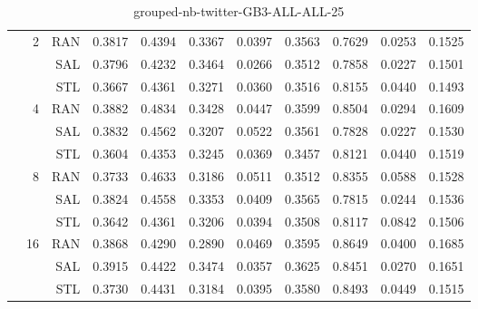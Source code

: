 \begin{center}
\begin{table}[htbp]
\begin{center}
\begin{tabular}{ | r | r | r | r | r | r | r | r | r | r | r |}
 & \multirow{3}{*}{2} & RAN & 0.3817 & 0.4394 & 0.3367 & 0.0397 & 0.3563 & 0.7629 & 0.0253 & 0.1525\\ \cline{3-11}
 &   & SAL & 0.3796 & 0.4232 & 0.3464 & 0.0266 & 0.3512 & 0.7858 & 0.0227 & 0.1501\\ \cline{3-11}
 &   & STL & 0.3667 & 0.4361 & 0.3271 & 0.0360 & 0.3516 & 0.8155 & 0.0440 & 0.1493\\ \cline{2-11}
 & \multirow{3}{*}{4} & RAN & 0.3882 & 0.4834 & 0.3428 & 0.0447 & 0.3599 & 0.8504 & 0.0294 & 0.1609\\ \cline{3-11}
 &   & SAL & 0.3832 & 0.4562 & 0.3207 & 0.0522 & 0.3561 & 0.7828 & 0.0227 & 0.1530\\ \cline{3-11}
 &   & STL & 0.3604 & 0.4353 & 0.3245 & 0.0369 & 0.3457 & 0.8121 & 0.0440 & 0.1519\\ \cline{2-11}
 & \multirow{3}{*}{8} & RAN & 0.3733 & 0.4633 & 0.3186 & 0.0511 & 0.3512 & 0.8355 & 0.0588 & 0.1528\\ \cline{3-11}
 &   & SAL & 0.3824 & 0.4558 & 0.3353 & 0.0409 & 0.3565 & 0.7815 & 0.0244 & 0.1536\\ \cline{3-11}
 &   & STL & 0.3642 & 0.4361 & 0.3206 & 0.0394 & 0.3508 & 0.8117 & 0.0842 & 0.1506\\ \cline{2-11}
 & \multirow{3}{*}{16} & RAN & 0.3868 & 0.4290 & 0.2890 & 0.0469 & 0.3595 & 0.8649 & 0.0400 & 0.1685\\ \cline{3-11}
 &   & SAL & 0.3915 & 0.4422 & 0.3474 & 0.0357 & 0.3625 & 0.8451 & 0.0270 & 0.1651\\ \cline{3-11}
 &   & STL & 0.3730 & 0.4431 & 0.3184 & 0.0395 & 0.3580 & 0.8493 & 0.0449 & 0.1515\\ \cline{2-11}
\hline
\end{tabular}
\caption{grouped-nb-twitter-GB3-ALL-ALL-25}
\end{center}
 \end{table}
\end{center}

